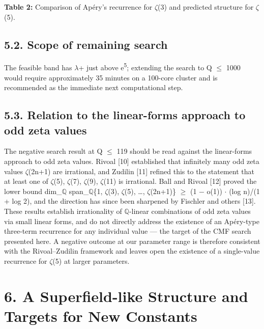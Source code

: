 \documentclass[11pt]{article}
\begin{document}
\textbf{Table 2:} Comparison of Apéry's recurrence for \(\zeta\)(3) and
predicted structure for \(\zeta\)(5).

\hypertarget{scope-of-remaining-search}{%
\subsection{5.2. Scope of remaining
search}\label{scope-of-remaining-search}}

The feasible band has \(\lambda\)+ just above e\textsuperscript{5};
extending the search to Q \(\leq\) 1000 would require approximately 35
minutes on a 100-core cluster and is recommended as the immediate next
computational step.

\hypertarget{relation-to-the-linear-forms-approach-to-odd-zeta-values}{%
\subsection{5.3. Relation to the linear-forms approach to odd zeta
values}\label{relation-to-the-linear-forms-approach-to-odd-zeta-values}}

The negative search result at Q \(\leq\) 119 should be read against the
linear-forms approach to odd zeta values. Rivoal {[}10{]} established
that infinitely many odd zeta values \(\zeta\)(2n+1) are irrational, and
Zudilin {[}11{]} refined this to the statement that at least one of
\(\zeta\)(5), \(\zeta\)(7), \(\zeta\)(9), \(\zeta\)(11) is irrational.
Ball and Rivoal {[}12{]} proved the lower bound dim\_\(\mathbb{Q}\)
span\_\(\mathbb{Q}\)\{1, \(\zeta\)(3), \(\zeta\)(5), \ldots,
\(\zeta\)(2n+1)\} \(\geq\) (1 − o(1)) \(\cdot\) (log n)/(1 + log 2), and
the direction has since been sharpened by Fischler and others {[}13{]}.
These results establish irrationality of \(\mathbb{Q}\)-linear
combinations of odd zeta values via small linear forms, and do not
directly address the existence of an Apéry-type three-term recurrence
for any individual value --- the target of the CMF search presented
here. A negative outcome at our parameter range is therefore consistent
with the Rivoal--Zudilin framework and leaves open the existence of a
single-value recurrence for \(\zeta\)(5) at larger parameters.

\hypertarget{a-superfield-like-structure-and-targets-for-new-constants}{%
\section{6. A Superfield-like Structure and Targets for New
Constants}\label{a-superfield-like-structure-and-targets-for-new-constants}}
\end{document}
